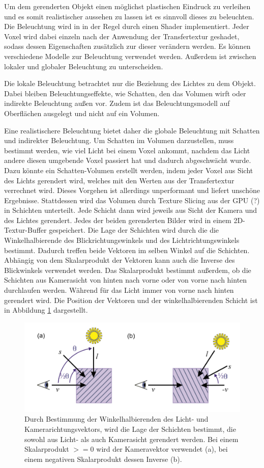 Um dem gerenderten Objekt einen möglichst plastischen Eindruck zu verleihen und es somit realistischer aussehen zu lassen ist es sinnvoll dieses zu beleuchten. 
Die Beleuchtung wird in in der Regel durch einen Shader implementiert. Jeder Voxel wird dabei einzeln nach der Anwendung der Transfertextur geshadet, sodass dessen Eigenschaften zusätzlich zur dieser verändern werden. Es können verschiedene Modelle zur Beleuchtung verwendet werden. Außerdem ist zwischen lokaler und globaler Beleuchtung zu unterscheiden.


Die lokale Beleuchtung betrachtet nur die Beziehung des Lichtes zu dem Objekt. Dabei bleiben Beleuchtungseffekte, wie Schatten, den das Volumen wirft oder indirekte Beleuchtung außen vor. Zudem ist das Beleuchtungsmodell auf Oberflächen ausgelegt und nicht auf ein Volumen. 

Eine realistischere Beleuchtung bietet daher die globale Beleuchtung mit Schatten und indirekter Beleuchtung.
Um Schatten im Volumen darzustellen, muss bestimmt werden, wie viel Licht bei einem Voxel ankommt, nachdem das Licht andere diesen umgebende Voxel passiert hat und dadurch abgeschwächt wurde. 
Dazu könnte ein Schatten-Volumen erstellt werden, indem jeder Voxel aus Sicht des Lichts gerendert wird, welches mit den Werten aus der Transfertextur verrechnet wird. Dieses Vorgehen ist allerdings unperformant und liefert unschöne Ergebnisse.\cite{Fernando04}
Stattdessen wird das Volumen durch Texture Slicing aus der GPU (?) in Schichten unterteilt. Jede Schicht dann wird jeweils aus Sicht der Kamera und des Lichtes gerendert. Jedes der beiden gerenderten Bilder wird in einem 2D-Textur-Buffer gespeichert. 
Die Lage der Schichten wird durch die die Winkelhalbierende des Blickrichtungswinkels und des Lichtrichtungswinkels bestimmt. Dadurch treffen beide Vektoren im selben Winkel auf die Schichten. Abhängig von dem Skalarprodukt der Vektoren kann auch die Inverse des Blickwinkels verwendet werden. Das Skalarprodukt bestimmt außerdem, ob die Schichten aus Kamerasicht von hinten nach vorne oder von vorne nach hinten durchlaufen werden. Während für das Licht immer von vorne nach hinten gerendert wird.
Die Position der Vektoren und der winkelhalbierenden Schicht ist in Abbildung \ref{img:halfAngleSlice} dargestellt.

\begin{figure}
	\centering
	\includegraphics[width=0.7\linewidth]{images/halfAngleSlice.png}
	\caption{Durch Bestimmung der Winkelhalbierenden des Licht- und Kamerarichtungsvektors, wird die Lage der Schichten bestimmt, die sowohl aus Licht- als auch Kamerasicht gerendert werden. Bei einem Skalarprodukt $>=0$ wird der Kameravektor verwendet (a), bei einem negativen Skalarprodukt dessen Inverse (b). \cite{Hadwiger06}}
	\label{img:halfAngleSlice}
\end{figure}


